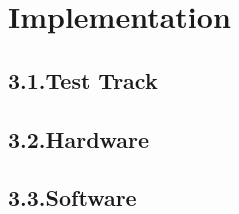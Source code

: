 %
\chapter{Implementation}\label{cha:Implementation}
%
\section*{3.1.Test Track}\label{sec:Test Track}

\section*{3.2.Hardware}\label{sec:Hardware}

\section*{3.3.Software}\label{sec:Software}



